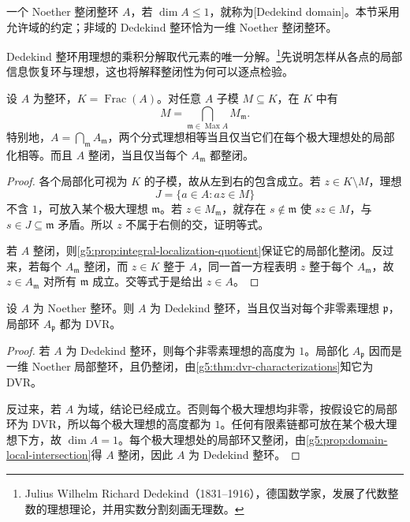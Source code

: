 \begin{definition}
\label{g5:def:dedekind-domain}
	一个 Noether 整闭整环 \(A\)，若 \(\dim A\leq1\)，就称为[Dedekind domain]。本节采用允许域的约定；非域的 Dedekind 整环恰为一维 Noether 整闭整环。
\end{definition}

Dedekind 整环用理想的乘积分解取代元素的唯一分解。\footnote{Julius Wilhelm Richard Dedekind（1831--1916），德国数学家，发展了代数整数的理想理论，并用实数分割刻画无理数。}先说明怎样从各点的局部信息恢复环与理想，这也将解释整闭性为何可以逐点检验。

\begin{proposition}
\label{g5:prop:domain-local-intersection}
	设 \(A\) 为整环，\(K=\operatorname{Frac}(A)\)。对任意 \(A\) 子模 \(M\subseteq K\)，在 \(K\) 中有
	\[
		M=\bigcap_{\mathfrak m\in\operatorname{Max}A}M_{\mathfrak m}.
	\]
	特别地，\(A=\bigcap_{\mathfrak m}A_{\mathfrak m}\)，两个分式理想相等当且仅当它们在每个极大理想处的局部化相等。而且 \(A\) 整闭，当且仅当每个 \(A_{\mathfrak m}\) 都整闭。
\end{proposition}
\begin{proof}
	各个局部化可视为 \(K\) 的子模，故从左到右的包含成立。若 \(z\in K\setminus M\)，理想
	\[
		J=\{a\in A:az\in M\}
	\]
	不含 \(1\)，可放入某个极大理想 \(\mathfrak m\)。若 \(z\in M_{\mathfrak m}\)，就存在 \(s\notin\mathfrak m\) 使 \(sz\in M\)，与 \(s\in J\subseteq\mathfrak m\) 矛盾。所以 \(z\) 不属于右侧的交，证明等式。

	若 \(A\) 整闭，则\cref{g5:prop:integral-localization-quotient}保证它的局部化整闭。反过来，若每个 \(A_{\mathfrak m}\) 整闭，而 \(z\in K\) 整于 \(A\)，同一首一方程表明 \(z\) 整于每个 \(A_{\mathfrak m}\)，故 \(z\in A_{\mathfrak m}\) 对所有 \(\mathfrak m\) 成立。交等式于是给出 \(z\in A\)。
\end{proof}

\begin{theorem}
\label{g5:thm:dedekind-local}
	设 \(A\) 为 Noether 整环。则 \(A\) 为 Dedekind 整环，当且仅当对每个非零素理想 \(\mathfrak p\)，局部环 \(A_{\mathfrak p}\) 都为 DVR。
\end{theorem}
\begin{proof}
	若 \(A\) 为 Dedekind 整环，则每个非零素理想的高度为 \(1\)。局部化 \(A_{\mathfrak p}\) 因而是一维 Noether 局部整环，且仍整闭，由\cref{g5:thm:dvr-characterizations}知它为 DVR。

	反过来，若 \(A\) 为域，结论已经成立。否则每个极大理想均非零，按假设它的局部环为 DVR，所以每个极大理想的高度都为 \(1\)。任何有限素链都可放在某个极大理想下方，故 \(\dim A=1\)。每个极大理想处的局部环又整闭，由\cref{g5:prop:domain-local-intersection}得 \(A\) 整闭，因此 \(A\) 为 Dedekind 整环。
\end{proof}

